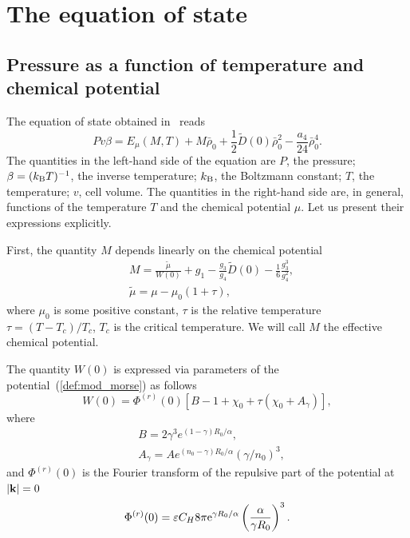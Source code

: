 \section{\label{sec:eos}The equation of state}
\subsection{Pressure as a function of temperature and chemical potential}
The equation of state obtained in~\cite{KozlovskiiDobush2020} reads
\begin{equation}
	\label{eq:eosMT}
	Pv\beta = E_\mu(M, T) + M \bar \rho_0 + \frac{1}{2} \tilde D(0) \bar \rho_0^2 - \frac{a_4}{24} \bar \rho_0^4.
\end{equation}
The quantities in the left-hand side of the equation are $P$, the pressure; $\beta = (k_{\rm B} T)^{-1}$, the inverse temperature; $k_{\rm B}$, the Boltzmann constant; $T$, the temperature; $v$, cell volume. The quantities in the right-hand side are, in general, functions of the temperature $T$ and the chemical potential $\mu$. Let us present their expressions explicitly.

First, the quantity $M$ depends linearly on the chemical potential
\begin{align}\label{chem_pot}
	&	M = \frac{\tilde\mu}{W(0)} + g_1 - \frac{g_3}{g_4} \tilde D(0) - \frac{1}{6} \frac{g_3^3}{g_4^2}, \\
	&	\tilde\mu=\mu-\mu_0(1+\tau),
\end{align}
where $\mu_0$ is some positive constant, $\tau$ is the relative temperature $\tau = (T - T_c) / T_c$, $T_c$ is the critical temperature. We will call $M$ the effective chemical potential.

The quantity $W(0)$ is expressed via parameters of the potential~(\ref{def:mod_morse}) as follows
\begin{equation}
	W(0) = \Phi^{(r)}(0) \left[ B - 1 + \chi_0 + \tau (\chi_0 + A_\gamma) \right],
\end{equation}
where
\begin{align*} 
	& B = 2 \gamma^3 e^{(1-\gamma)R_0/\alpha},
	\nonumber \\
	& A_\gamma = A e^{(n_0-\gamma)R_0/\alpha} \left( \gamma / n_0\right)^3, 
\end{align*}
and $\Phi^{(r)}(0)$ is the Fourier transform of the repulsive part of the potential at $\abs{\vb k}=0$
\begin{equation*}
	\Phi^{(r)}(0) = \varepsilon C_H 8\pi {\rm e}^{\gamma R_0/\alpha} \left(\frac{\alpha}{\gamma R_0}\right)^3.
\end{equation*}

